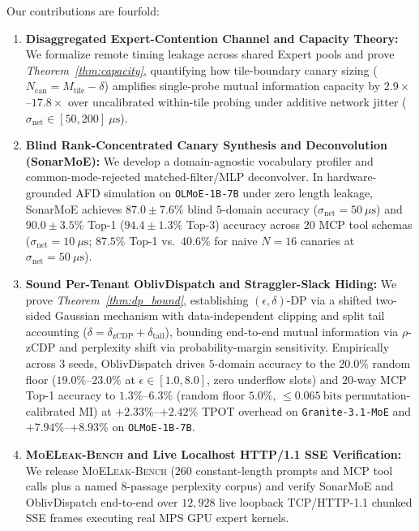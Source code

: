 \documentclass[10pt,journal,compsoc]{IEEEtran}
\def\SM{SonarMoE}%
\def\OD{OblivDispatch}%
\theoremstyle{definition}
\theoremstyle{remark}
\newcommand{\SM}{\textsc{SonarMoE}}
\newcommand{\OD}{\textsc{OblivDispatch}}
\newcommand{\MLB}{\textsc{MoELeak-Bench}}
\begin{document}
Our contributions are fourfold:
\begin{enumerate}
  \item \textbf{Disaggregated Expert-Contention Channel and Capacity Theory:} We formalize remote timing leakage across shared Expert pools and prove \emph{Theorem~\ref{thm:capacity}}, quantifying how tile-boundary canary sizing ($N_{\mathrm{can}} = M_{\mathrm{tile}} - \delta$) amplifies single-probe mutual information capacity by $2.9\times$--$17.8\times$ over uncalibrated within-tile probing under additive network jitter ($\sigma_{\mathrm{net}} \in [50, 200]~\mu\mathrm{s}$).
  \item \textbf{Blind Rank-Concentrated Canary Synthesis and Deconvolution (\SM{}):} We develop a domain-agnostic vocabulary profiler and common-mode-rejected matched-filter/MLP deconvolver. In hardware-grounded AFD simulation on \texttt{OLMoE-1B-7B} under zero length leakage, \SM{} achieves $87.0 \pm 7.6\%$ blind $5$-domain accuracy ($\sigma_{\mathrm{net}} = 50~\mu\mathrm{s}$) and $90.0 \pm 3.5\%$ Top-1 ($94.4 \pm 1.3\%$ Top-3) accuracy across $20$ MCP tool schemas ($\sigma_{\mathrm{net}} = 10~\mu\mathrm{s}$; $87.5\%$ Top-1 vs.\ $40.6\%$ for naive $N=16$ canaries at $\sigma_{\mathrm{net}} = 50~\mu\mathrm{s}$).
  \item \textbf{Sound Per-Tenant \OD{} and Straggler-Slack Hiding:} We prove \emph{Theorem~\ref{thm:dp_bound}}, establishing $(\epsilon, \delta)$-DP via a shifted two-sided Gaussian mechanism with data-independent clipping and split tail accounting ($\delta = \delta_{\mathrm{zCDP}} + \delta_{\mathrm{tail}}$), bounding end-to-end mutual information via $\rho$-zCDP and perplexity shift via probability-margin sensitivity. Empirically across $3$ seeds, \OD{} drives $5$-domain accuracy to the $20.0\%$ random floor ($19.0\%$--$23.0\%$ at $\epsilon \in [1.0, 8.0]$, zero underflow slots) and $20$-way MCP Top-1 accuracy to $1.3\%$--$6.3\%$ (random floor $5.0\%$, $\le 0.065~\mathrm{bits}$ permutation-calibrated MI) at $+2.33\%$--$+2.42\%$ TPOT overhead on \texttt{Granite-3.1-MoE} and $+7.94\%$--$+8.93\%$ on \texttt{OLMoE-1B-7B}.
  \item \textbf{\MLB{} and Live Localhost HTTP/1.1 SSE Verification:} We release \MLB{} ($260$ constant-length prompts and MCP tool calls plus a named $8$-passage perplexity corpus) and verify \SM{} and \OD{} end-to-end over $12{,}928$ live loopback TCP/HTTP-1.1 chunked SSE frames executing real MPS GPU expert kernels.
\end{enumerate}
\end{document}
